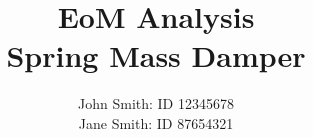 \title{
EoM Analysis
\\
 Spring Mass Damper 
\\
}
\author{
John Smith: ID 12345678
\\
Jane Smith: ID 87654321
\\
}
